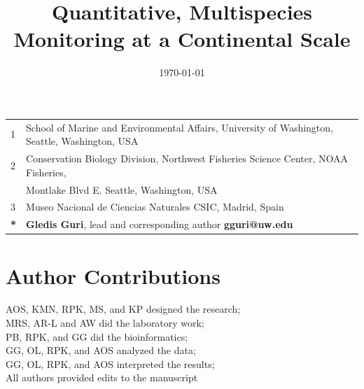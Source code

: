 \documentclass{article}
\title{Quantitative, Multispecies Monitoring at a Continental Scale}
\author{Gledis Guri$^1$\textbf{*} \and
Owen Liu$^2$ \and
Ryan P. Kelly$^1$ \and
Megan R. Shaffer$^1$\and
Kim Parsons$^2$ \and
Ana Ram\'on-Laca$^{1,2,3}$ \and
Krista M. Nichols$^2$ \and
Pedro F. P. Brandão-Dias$^1$ \and
Abigail Wells$^2$ \and
Andrew Olaf Shelton$^2$ \and}
\date{\today}
\begin{document}
\maketitle

\section*{}

\begin{center}
\begin{tabular}{ll}
1 & School of Marine and Environmental Affairs, University of Washington, Seattle, Washington, USA \\
2 & Conservation Biology Division, Northwest Fisheries Science Center, NOAA Fisheries, \\
 & \qquad 2715 Montlake Blvd E. Seattle, Washington, USA \\
3 & Museo Nacional de Ciencias Naturales CSIC, Madrid, Spain \\
\hline
\textbf{*} & \textbf{Gledis Guri}, lead and corresponding author \textbf{gguri@uw.edu}
\end{tabular}
\end{center}


\section*{Author Contributions}
AOS, KMN, RPK, MS, and KP designed the research;\\
MRS, AR-L and AW did the laboratory work; \\
PB, RPK, and GG did the bioinformatics;\\
GG, OL, RPK, and AOS analyzed the data;\\
GG, OL, RPK, and AOS interpreted the results;\\
All authors provided edits to the manuscript \\
\end{document}
